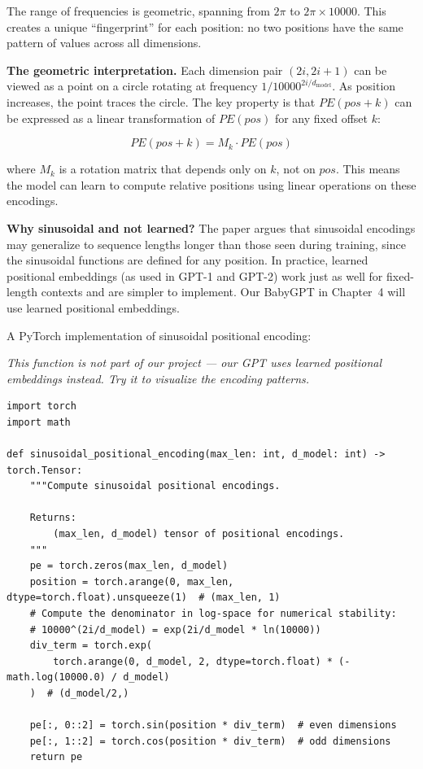 The range of frequencies is geometric, spanning from $2\pi$ to $2\pi \times 10000$. This creates a unique ``fingerprint'' for each position: no two positions have the same pattern of values across all dimensions.

\textbf{The geometric interpretation.} Each dimension pair $(2i, 2i+1)$ can be viewed as a point on a circle rotating at frequency $1/10000^{2i/d_{\text{model}}}$. As position increases, the point traces the circle. The key property is that $PE(pos + k)$ can be expressed as a linear transformation of $PE(pos)$ for any fixed offset $k$:

\[PE(pos + k) = M_k \cdot PE(pos)\]

where $M_k$ is a rotation matrix that depends only on $k$, not on $pos$. This means the model can learn to compute relative positions using linear operations on these encodings.

\textbf{Why sinusoidal and not learned?} The paper argues that sinusoidal encodings may generalize to sequence lengths longer than those seen during training, since the sinusoidal functions are defined for any position. In practice, learned positional embeddings (as used in GPT-1 and GPT-2) work just as well for fixed-length contexts and are simpler to implement. Our BabyGPT in Chapter~4 will use learned positional embeddings.

A PyTorch implementation of sinusoidal positional encoding:

\demotag
{\small\itshape This function is not part of our project --- our GPT uses learned positional embeddings instead. Try it to visualize the encoding patterns.}
\begin{lstlisting}
import torch
import math

def sinusoidal_positional_encoding(max_len: int, d_model: int) -> torch.Tensor:
    """Compute sinusoidal positional encodings.

    Returns:
        (max_len, d_model) tensor of positional encodings.
    """
    pe = torch.zeros(max_len, d_model)
    position = torch.arange(0, max_len, dtype=torch.float).unsqueeze(1)  # (max_len, 1)
    # Compute the denominator in log-space for numerical stability:
    # 10000^(2i/d_model) = exp(2i/d_model * ln(10000))
    div_term = torch.exp(
        torch.arange(0, d_model, 2, dtype=torch.float) * (-math.log(10000.0) / d_model)
    )  # (d_model/2,)

    pe[:, 0::2] = torch.sin(position * div_term)  # even dimensions
    pe[:, 1::2] = torch.cos(position * div_term)  # odd dimensions
    return pe
\end{lstlisting}

